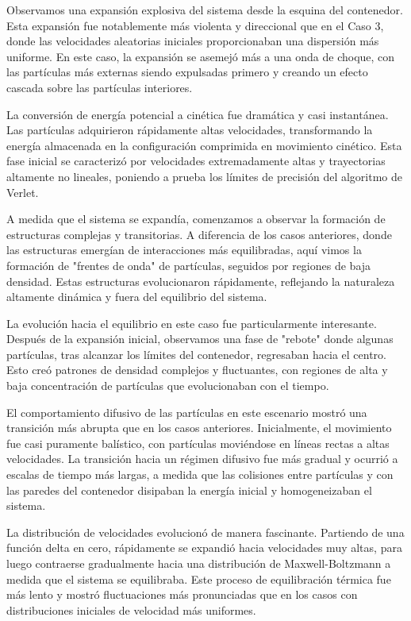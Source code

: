 \documentclass[twocolumn]{article}
\begin{document}
Observamos una expansión explosiva del sistema desde la esquina del contenedor. Esta expansión fue notablemente más violenta y direccional que en el Caso 3, donde las velocidades aleatorias iniciales proporcionaban una dispersión más uniforme. En este caso, la expansión se asemejó más a una onda de choque, con las partículas más externas siendo expulsadas primero y creando un efecto cascada sobre las partículas interiores.

La conversión de energía potencial a cinética fue dramática y casi instantánea. Las partículas adquirieron rápidamente altas velocidades, transformando la energía almacenada en la configuración comprimida en movimiento cinético. Esta fase inicial se caracterizó por velocidades extremadamente altas y trayectorias altamente no lineales, poniendo a prueba los límites de precisión del algoritmo de Verlet.

A medida que el sistema se expandía, comenzamos a observar la formación de estructuras complejas y transitorias. A diferencia de los casos anteriores, donde las estructuras emergían de interacciones más equilibradas, aquí vimos la formación de "frentes de onda" de partículas, seguidos por regiones de baja densidad. Estas estructuras evolucionaron rápidamente, reflejando la naturaleza altamente dinámica y fuera del equilibrio del sistema.

La evolución hacia el equilibrio en este caso fue particularmente interesante. Después de la expansión inicial, observamos una fase de "rebote" donde algunas partículas, tras alcanzar los límites del contenedor, regresaban hacia el centro. Esto creó patrones de densidad complejos y fluctuantes, con regiones de alta y baja concentración de partículas que evolucionaban con el tiempo.

El comportamiento difusivo de las partículas en este escenario mostró una transición más abrupta que en los casos anteriores. Inicialmente, el movimiento fue casi puramente balístico, con partículas moviéndose en líneas rectas a altas velocidades. La transición hacia un régimen difusivo fue más gradual y ocurrió a escalas de tiempo más largas, a medida que las colisiones entre partículas y con las paredes del contenedor disipaban la energía inicial y homogeneizaban el sistema.

La distribución de velocidades evolucionó de manera fascinante. Partiendo de una función delta en cero, rápidamente se expandió hacia velocidades muy altas, para luego contraerse gradualmente hacia una distribución de Maxwell-Boltzmann a medida que el sistema se equilibraba. Este proceso de equilibración térmica fue más lento y mostró fluctuaciones más pronunciadas que en los casos con distribuciones iniciales de velocidad más uniformes.
\end{document}

